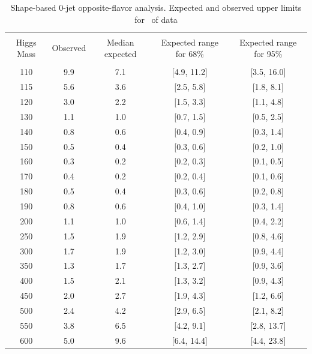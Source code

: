 \begin{table}[!hbp]
\begin{center}
\begin{tabular}{c c c c c}
\hline
\vspace{-3mm} && \\
 Higgs Mass   & Observed & Median expected & Expected range for 68\% & Expected range for 95\%   \\
\vspace{-3mm} && \\
\hline
110 & 9.9 & 7.1 & [4.9, 11.2] & [3.5, 16.0] \\
115 & 5.6 & 3.6 & [2.5, 5.8] & [1.8, 8.1] \\
120 & 3.0 & 2.2 & [1.5, 3.3] & [1.1, 4.8] \\
130 & 1.1 & 1.0 & [0.7, 1.5] & [0.5, 2.5] \\
140 & 0.8 & 0.6 & [0.4, 0.9] & [0.3, 1.4] \\
150 & 0.5 & 0.4 & [0.3, 0.6] & [0.2, 1.0] \\
160 & 0.3 & 0.2 & [0.2, 0.3] & [0.1, 0.5] \\
170 & 0.4 & 0.2 & [0.2, 0.4] & [0.1, 0.6] \\
180 & 0.5 & 0.4 & [0.3, 0.6] & [0.2, 0.8] \\
190 & 0.8 & 0.6 & [0.4, 1.0] & [0.3, 1.4] \\
200 & 1.1 & 1.0 & [0.6, 1.4] & [0.4, 2.2] \\
250 & 1.5 & 1.9 & [1.2, 2.9] & [0.8, 4.6] \\
300 & 1.7 & 1.9 & [1.2, 3.0] & [0.9, 4.4] \\
350 & 1.3 & 1.7 & [1.3, 2.7] & [0.9, 3.6] \\
400 & 1.5 & 2.1 & [1.3, 3.2] & [0.9, 4.3] \\
450 & 2.0 & 2.7 & [1.9, 4.3] & [1.2, 6.6] \\
500 & 2.4 & 4.2 & [2.9, 6.5] & [2.1, 8.2] \\
550 & 3.8 & 6.5 & [4.2, 9.1] & [2.8, 13.7] \\
600 & 5.0 & 9.6 & [6.4, 14.4] & [4.4, 23.8] \\
\hline
\end{tabular}
\caption{Shape-based 0-jet opposite-flavor analysis. Expected and observed
  upper limits for \intlumi\ of data}
\label{tab:of0_cut}
\end{center}
\end{table}

